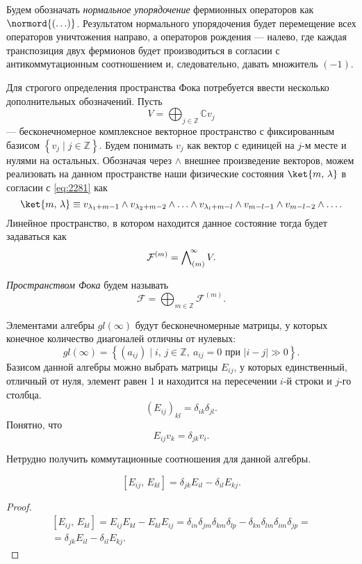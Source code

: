 \documentclass[a4paper,14pt]{extarticle}
\numberwithin{equation}{section}
\begin{document}
\begin{dfn*}
Будем обозначать \emph{нормальное упорядочение} фермионных
операторов как $\normord{\left( \ldots \right) }$.
Результатом нормального упорядочения будет перемещение
всех операторов уничтожения направо, а операторов
рождения --- налево, где каждая транспозиция двух
фермионов будет производиться в согласии с антикоммутационным
соотношением и, следовательно, давать множитель $(-1)$. 

\end{dfn*}
Для строгого определения пространства Фока потребуется ввести несколько дополнительных обозначений. Пусть
\[
	V=\bigoplus_{j \in \mathbb{Z}} \mathbb{C}  v_j
\]
--- бесконечномерное комплексное векторное пространство с фиксированным базисом $\left\{ v_j \mid j \in \mathbb{Z} \right\} $. Будем понимать $v_j$ как вектор с единицей
на $j$-м месте и нулями на остальных.
Обозначая через $\wedge$ внешнее произведение векторов, можем
реализовать на данном пространстве наши физические состояния
$\ket{m,\,\lambda}$  в согласии с \eqref{eq:2281} как
\[
\ket{m,\,\lambda}\equiv v_{\lambda_1+m-1}\wedge v_{\lambda_2+m-2}\wedge\ldots\wedge   v_{\lambda_l+m-l}\wedge v_{m-l-1}\wedge
 v_{m-l-2}\wedge \ldots
.\] 
Линейное пространство, в котором находится данное состояние тогда
будет задаваться как
\[
	\mathcal{F}^{(m)}= \bigwedge \nolimits ^{\mkern-4mu\infty}_{(m)}V
.\] 
\begin{dfn*}
\emph{Пространством Фока} будем называть
\[
	\mathcal{F}=\bigoplus_{m \in \mathbb{Z}} \mathcal{F}^{(m)}
.\] 
\end{dfn*}

\begin{dfn*}
Элементами алгебры $gl(\infty)$ будут бесконечномерные матрицы,
у которых конечное количество диагоналей отличны от нулевых:
\begin{equation}
	gl(\infty)=\left\{ 
	\left( a_{ij} \right) \mid i,\,j \in \mathbb{Z},\ a_{ij}=0 \text{ при } \left| i-j \right| \gg 0\right\} 
.\end{equation} 
Базисом данной алгебры можно выбрать матрицы  $E_{ij}$,
у которых единственный, отличный от нуля, элемент равен 1 и находится
на пересечении $i$-й строки и $j$-го столбца.
 \begin{equation}
	(E_{ij})_{kl}=\delta_{ik}\delta_{jl}
.\end{equation} 
Понятно, что
\[
E_{ij}v_k= \delta_{jk} v_i
.\] 

\end{dfn*}
Нетрудно получить коммутационные соотношения для данной алгебры.
\begin{stm*}
\[
\left[ E_{ij},\,E_{kl} \right] =
\delta_{jk}E_{il}-\delta_{il}E_{kj}
.\]
\end{stm*}
\begin{proof}
\begin{multline}
\left[ E_{ij},\,E_{kl} \right] =
E_{ij}E_{kl}-E_{kl}E_{ij}=
\delta_{in}\delta_{jm}\delta_{km}\delta_{lp}-
\delta_{kn}\delta_{lm}\delta_{im}\delta_{jp}=\\=
\delta_{jk}E_{il}-\delta_{il}E_{kj}
.\end{multline} 
\end{proof}
\end{document}
